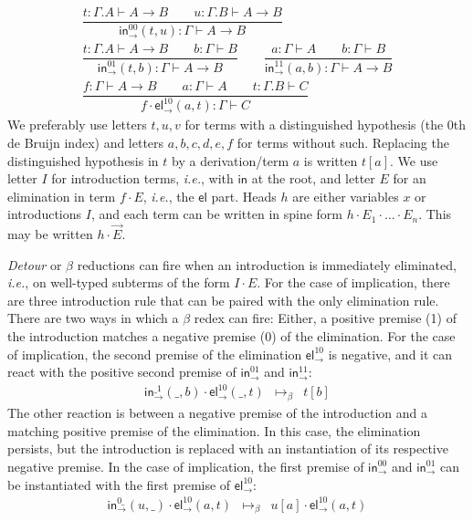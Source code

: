 \documentclass[a4paper,USenglish,cleveref, autoref, thm-restate]{lipics-v2019}
\newcommand{\ie}{\emph{i.e.}\xspace}
\newcommand{\ru}{\dfrac}
\newcommand{\tin}{\ensuremath{\mathsf{in}}}
\newcommand{\inn}[2]{\ensuremath{\tin_{#1}^{#2}}}
\newcommand{\tel}{\mathsf{el}}
\newcommand{\el}[2]{\ensuremath{\tel_{#1}^{#2}}}
\newcommand{\contract}[1][]{\mapsto_{#1}}
\begin{document}
%
\begin{gather*}
  \ru{t : \Gamma.A \vdash A \to B \qquad
      u : \Gamma.B \vdash A \to B
    }{\inn\to{00}(t,u) : \Gamma \vdash A \to B
    }
\\[2ex]
  \ru{t : \Gamma.A \vdash A \to B \qquad
      b : \Gamma \vdash B
    }{\inn\to{01}(t,b) : \Gamma \vdash A \to B
    }
\qquad
  \ru{a : \Gamma \vdash A \qquad
      b : \Gamma \vdash B
    }{\inn\to{11}(a,b) : \Gamma \vdash A \to B
    }
\\[2ex]
  \ru{f : \Gamma \vdash A \to B \qquad
      a : \Gamma \vdash A \qquad
      t : \Gamma.B \vdash C
    }{f \cdot \el\to{10}(a,t) : \Gamma \vdash C
    }
\end{gather*}
We preferably use letters $t,u,v$ for terms with a distinguished
hypothesis (the 0th de Bruijn index)
and letters $a,b,c,d,e,f$ for terms without such.
Replacing the distinguished hypothesis in $t$ by a derivation/term $a$
is written $t[a]$.  We use letter $I$ for introduction terms, \ie,
with $\tin$ at the root, and letter $E$ for an elimination in term $f
\cdot E$, \ie, the $\tel$ part.  Heads $h$ are either variables $x$ or
introductions $I$, and each term can be written in spine form $h \cdot
E_1 \cdot \dots \cdot E_n$.  This may be written $h \cdot \vec E$.

\emph{Detour} or $\beta$ reductions can fire when an introduction is
immediately eliminated, \ie, on well-typed subterms of the form $I
\cdot E$.  For the case of implication, there are three
introduction rule that can be paired with the only elimination rule.
There are two ways in which a $\beta$ redex can fire:  Either, a
positive premise (1) of the introduction matches a negative premise
(0) of the elimination.  For the case of implication, the second
premise of the elimination $\el\to{10}$
is negative, and it can react with the
positive second premise of $\inn\to{01}$ and $\inn\to{11}$:
\[
\begin{array}{lll}
  \inn\to{\_1}(\_,b) \cdot \el\to{10}(\_,t)
    & \contract[\beta] &
  t[b]
\end{array}
\]
The other reaction is between a negative premise of the introduction
and a matching positive premise of the elimination.  In this case, the
elimination persists, but the introduction is replaced with an
instantiation of its respective negative premise.  In the case of
implication, the first premise of $\inn\to{00}$ and $\inn\to{01}$ can
be instantiated with the first premise of $\el\to{10}$:
\[
\begin{array}{lll}
  \inn\to{0\_}(u,\_) \cdot \el\to{10}(a,t)
    & \contract[\beta] &
  u[a] \cdot \el\to{10}(a,t)
\\
\end{array}
\]
\end{document}
